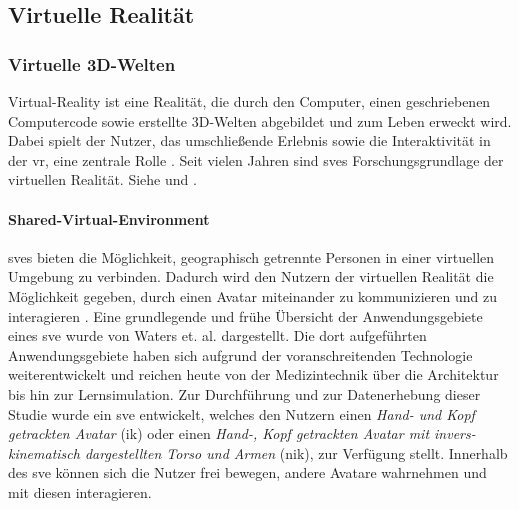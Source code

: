 \documentclass[a4paper,11pt]{article}%
\renewcommand{\\}{\vspace*{0.5\baselineskip} \newline}
\begin{document}
	\subsection{Virtuelle Realität}
	\label{Virtual Reality}
		\subsubsection{Virtuelle 3D-Welten}
Virtual-Reality ist eine Realität, die durch den Computer, einen geschriebenen Computercode sowie erstellte 3D-Welten abgebildet und zum Leben erweckt wird. Dabei spielt der Nutzer, das umschließende Erlebnis sowie die Interaktivität in der \ac{vr}, eine zentrale Rolle \citep[S.6-12]{sherman2018understanding}.
	Seit vielen Jahren sind \ac{sve}s Forschungsgrundlage der virtuellen Realität. Siehe \citep{shuffler2011there} \citep{steed1999leadership} und \citep{de2011level}.

\paragraph{Shared-Virtual-Environment}
	\ac{sve}s bieten die Möglichkeit, geographisch getrennte Personen in einer virtuellen Umgebung zu verbinden. Dadurch wird den Nutzern der virtuellen Realität die Möglichkeit gegeben, durch einen Avatar miteinander zu kommunizieren und zu interagieren \citep[S. 1-3]{pettifer1999designing}. Eine grundlegende und frühe Übersicht der Anwendungsgebiete eines \ac{sve} wurde von Waters et. al. \citep{waters1997rise} dargestellt. Die dort aufgeführten Anwendungsgebiete haben sich aufgrund der voranschreitenden Technologie weiterentwickelt und reichen heute von der Medizintechnik über die Architektur bis hin zur Lernsimulation.
	Zur Durchführung und zur Datenerhebung dieser Studie wurde ein \ac{sve} entwickelt, welches den Nutzern einen \textit{Hand- und Kopf getrackten Avatar} (\ac{ik}) oder einen \textit{Hand-, Kopf getrackten Avatar mit invers-kinematisch dargestellten Torso und Armen} (\ac{nik}), zur Verfügung stellt. Innerhalb des \ac{sve} können sich die Nutzer frei bewegen, andere Avatare wahrnehmen und mit diesen interagieren.
\end{document}
